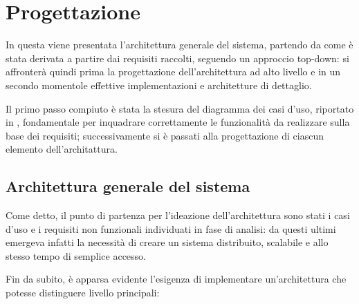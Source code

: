\section{Progettazione}\label{sec:project}




In questa  viene presentata l'architettura generale del sistema,
partendo da come è stata derivata a partire dai requisiti raccolti, seguendo un approccio top-down:
si affronterà quindi prima la progettazione dell'architettura ad alto livello
e in un secondo momentole effettive implementazioni e architetture di dettaglio.

Il primo passo compiuto è stata la stesura del diagramma dei casi d'uso, riportato in ,
fondamentale per inquadrare correttamente le funzionalità da realizzare sulla base dei requisiti;
successivamente si è passati alla progettazione di ciascun elemento dell'architattura.

\subsection{Architettura generale del sistema}

Come detto, il punto di partenza per l'ideazione dell'architettura sono stati i casi d'uso e i requisiti non funzionali individuati in fase di analisi:
da questi ultimi emergeva infatti la necessità di creare un sistema distribuito, scalabile e allo stesso tempo di semplice accesso.

Fin da subito, è apparsa evidente l'esigenza di implementare un'architettura che potesse distinguere livello principali:

